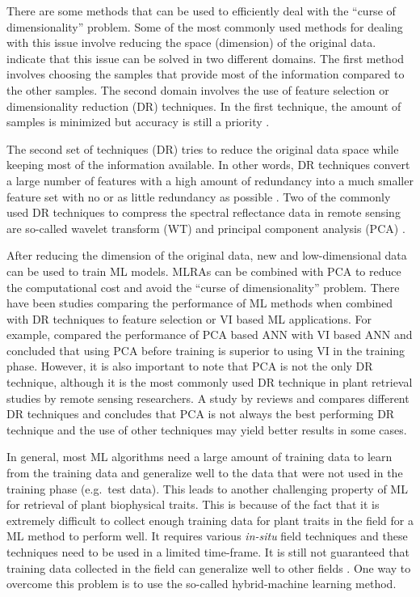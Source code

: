 \documentclass[a4paper, twoside]{templates/ociamthesis}
\begin{document}
There are some methods that can be used to efficiently deal with the ``curse of dimensionality'' problem. Some of the most commonly used methods for dealing with this issue involve reducing the space (dimension) of the original data. \citet{rivera2017hyperspectral} indicate that this issue can be solved in two different domains. The first method involves choosing the samples that provide most of the information compared to the other samples. The second domain involves the use of feature selection or dimensionality reduction (DR) techniques. In the first technique, the amount of samples is minimized but accuracy is still a priority \citep{rivera2017hyperspectral}.

The second set of techniques (DR) tries to reduce the original data space while keeping most of the information available. In other words, DR techniques convert a large number of features with a high amount of redundancy into a much smaller feature set with no or as little redundancy as possible \citep{lee2007nonlinear}. Two of the commonly used DR techniques to compress the spectral reflectance data in remote sensing are so-called wavelet transform (WT) and principal component analysis (PCA) \citep{ke2016estimating}.

After reducing the dimension of the original data, new and low-dimensional data can be used to train ML models. MLRAs can be combined with PCA to reduce the computational cost and avoid the ``curse of dimensionality'' problem. There have been studies comparing the performance of ML methods when combined with DR techniques to feature selection or VI based ML applications. For example, \citet{liu2017hyperspectral} compared the performance of PCA based ANN with VI based ANN and concluded that using PCA before training is superior to using VI in the training phase. However, it is also important to note that PCA is not the only DR technique, although it is the most commonly used DR technique in plant retrieval studies by remote sensing researchers. A study by \citet{rivera2017hyperspectral} reviews and compares different DR techniques and concludes that PCA is not always the best performing DR technique and the use of other techniques may yield better results in some cases.

In general, most ML algorithms need a large amount of training data to learn from the training data and generalize well to the data that were not used in the training phase (e.g.~test data). This leads to another challenging property of ML for retrieval of plant biophysical traits. This is because of the fact that it is extremely difficult to collect enough training data for plant traits in the field for a ML method to perform well. It requires various \emph{in-situ} field techniques and these techniques need to be used in a limited time-frame. It is still not guaranteed that training data collected in the field can generalize well to other fields \citep{danner2021efficient}. One way to overcome this problem is to use the so-called hybrid-machine learning method.
\end{document}
